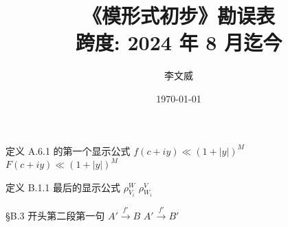 \documentclass{AJerrata}
\title{\bfseries 《模形式初步》勘误表 \\ 跨度: 2024 年 8 月迄今}
\author{李文威}
\date{\today}
\begin{document}
	\maketitle
	
	\begin{Errata}
		\item[定义 A.6.1 的第一个显示公式]
		\Orig $f(c + iy) \ll (1 + |y|)^M$
		\Corr $F(c + iy) \ll (1 + |y|)^M$
	
		\item[定义 B.1.1 最后的显示公式]
		\Orig $\rho^W_{V_i}$
		\Corr $\rho^V_{W_i}$
		
		\item[\S B.3 开头第二段第一句]
		\Orig $A' \xrightarrow{f'} B$
		\Corr $A' \xrightarrow{f'} B'$
	\end{Errata}
\end{document}
